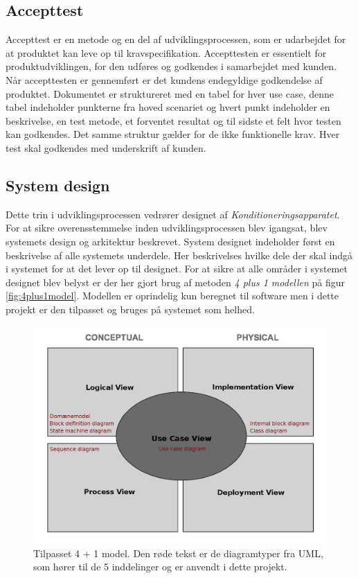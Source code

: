 	\subsection{Accepttest} \label{title:accepttest}
	Accepttest er en metode og en del af udviklingsprocessen, som er udarbejdet for at produktet kan leve op til kravspecifikation. Accepttesten er essentielt for produktudviklingen, for den udføres og godkendes i samarbejdet med kunden. Når accepttesten er gennemført er det kundens endegyldige godkendelse af produktet. 
	Dokumentet er struktureret med en tabel for hver use case, denne tabel indeholder punkterne fra hoved scenariet og hvert punkt indeholder en beskrivelse, en test metode, et forventet resultat og til sidste et felt hvor testen kan godkendes. Det samme struktur gælder for de ikke funktionelle krav. Hver test skal godkendes med underskrift af kunden.
	
	\subsection{System design} \label{title:systemdesign}
	Dette trin i udviklingsprocessen vedrører designet af \textit{Konditioneringsapparatet}. For at sikre overensstemmelse inden udviklingsprocessen blev igangsat, blev systemets design og arkitektur beskrevet. System designet indeholder først en beskrivelse af alle systemets underdele. Her beskrivelses hvilke dele der skal indgå i systemet for at det lever op til designet.
	For at sikre at alle områder i systemet designet blev belyst er der her gjort brug af metoden \textit{4 plus 1 modellen} på figur \ref{fig:4plus1model}. Modellen er oprindelig kun beregnet til software men i dette projekt er den tilpasset og bruges på systemet som helhed. 
	
	\begin{figure}[H]
		\includegraphics[width = \textwidth]{billeder/4plus1model.png}
		\caption{Tilpasset 4 + 1 model. Den røde tekst er de diagramtyper fra UML, som hører til de 5 inddelinger og er anvendt i dette projekt.}\label{4plus1model}
	\end{figure}
	
